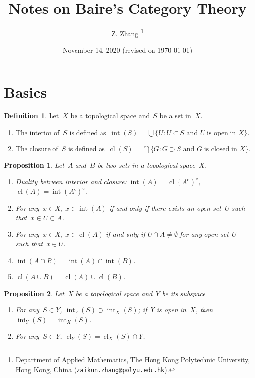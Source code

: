 \documentclass[11pt,a4paper]{article}  %
\title{Notes on Baire's Category Theory}
\date{November 14, 2020 (revised on \today)}
\author{
Z. Zhang
\thanks{
Department of Applied Mathematics, The Hong Kong Polytechnic
University, Hong Kong, China ({\tt zaikun.zhang@polyu.edu.hk}).
}
}
\newtheorem{proposition}{Proposition}[section]
\theoremstyle{definition}
\newtheorem{definition}{Definition}[section]
\newcommand{\co}{{\mathrm{c}}}
\DeclareMathOperator{\inter}{int}
\DeclareMathOperator{\cl}{cl}
\numberwithin{equation}{section}
\begin{document}
\maketitle

\section{Basics}

\begin{definition}
  \label{def:intcl}
  Let~$X$ be a topological space and~$S$ be a set in~$X$.
  \begin{enumerate}
    \item The interior of~$S$ is defined as~$\inter(S) = \bigcup\{U \mathrel{:} U\subset S \text{ and } U \text{ is open in } X\}$.
    \item The closure of~$S$ is defined as~$\cl(S) = \bigcap\{G \mathrel{:} G\supset S \text{ and } G \text{ is closed in } X\}$.
  \end{enumerate}
\end{definition}


\begin{proposition}
  \label{prop:intcl}
  Let~$A$ and~$B$ be two sets in a topological space~$X$.
  \begin{enumerate}
    \item Duality between interior and closure: $\inter(A) = \cl(A^\co)^\co$, $\cl(A)=\inter(A^\co)^\co$.
    \item For any~$x\in X$, $x\in \inter(A)$ if and only if there exists an open set~$U$ such that~$x\in U \subset A$.
    \item For any~$x\in X$, $x\in \cl(A)$ if and only if $U\cap A \neq \emptyset$ for any open set~$U$ such that~$x\in U$.
    \item $\inter(A\cap B) = \inter(A)\cap \inter(B)$.
    \item $\cl(A\cup B) = \cl(A)\cup \cl(B)$.
    \end{enumerate}
\end{proposition}

\begin{proposition}
  \label{prop:subintcl}
  Let~$X$ be a topological space and~$Y$ be its subspace
  \begin{enumerate}
    \item For any~$S\subset Y$, $\inter_Y(S) \supset \inter_X(S)$;
      if~$Y$ is open in~$X$, then $\inter_Y(S)=\inter_X(S)$.
    \item For any~$S\subset Y$, $\cl_Y(S) = \cl_X(S) \cap Y$.
  \end{enumerate}
\end{proposition}
\end{document}
